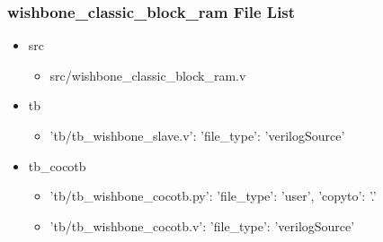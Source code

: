 \subsubsection{wishbone\_classic\_block\_ram File List}
\begin{itemize}
\item src
	\begin{itemize}
	\item src/wishbone\_classic\_block\_ram.v
	\end{itemize}
\item tb
	\begin{itemize}
	\item {'tb/tb\_wishbone\_slave.v': {'file\_type': 'verilogSource'}}
	\end{itemize}
\item tb\_cocotb
	\begin{itemize}
	\item {'tb/tb\_wishbone\_cocotb.py': {'file\_type': 'user', 'copyto': '.'}}
	\item {'tb/tb\_wishbone\_cocotb.v': {'file\_type': 'verilogSource'}}
	\end{itemize}
\end{itemize}
